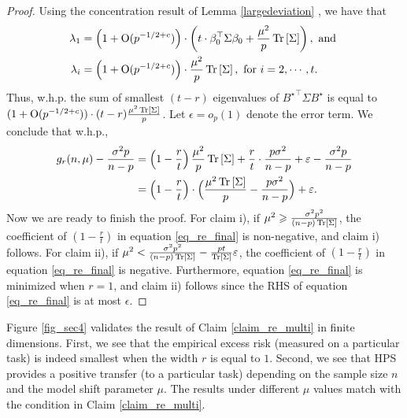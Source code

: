 \begin{proof}
    Using the concentration result of Lemma \ref{largedeviation} , we have that
    \begin{align*}
        \lambda_1 &= \Big(1+\OO(p^{-1/2+c})\Big)\cdot\left(t\cdot \beta_0^\top \Sigma \beta_0  + \frac{\mu^2}{ p}\bigtr{\Sigma}\right) , \text{ and } \\
        \lambda_i &= \Big(1+\OO(p^{-1/2+c})\Big)\cdot \frac{\mu^2}{ p}\bigtr{\Sigma}, \text{ for } i=2,\cdots, t.
    \end{align*}
    Thus, w.h.p. the sum of smallest $(t - r)$ eigenvalues of ${B^{\star}}^{\top}\Sigma  B^{\star}$ is equal to
    $(1+\operatorname{O}(p^{-1/2+c}))\cdot(t-r)\frac{\mu^2 \operatorname{Tr}\left[\Sigma\right]}{p}$.
    Let $\epsilon = o_p(1)$ denote the error term.
    We conclude that w.h.p.,
    \begin{align}
        g_r(n, \mu) - \frac{\sigma^2 p}{n - p} &= \bigbrace{1 - \frac{r}{t}} \frac{\mu^2}{p}\bigtr{\Sigma} + \frac{r}{t} \cdot \frac{p\sigma^2 }{n - p} + \epsilon - \frac{\sigma^2 p}{n - p} \nonumber \\
        &= \Big(1 - \frac r t\Big) \cdot \Big(\frac{\mu^2\bigtr{\Sigma}}{p} - \frac{p\sigma^2}{n - p}\Big) + \epsilon. \label{eq_re_final}
    \end{align}
    Now we are ready to finish the proof.
    For claim i), if $\mu^2 \geqslant \frac{\sigma^2 p^2}{(n - p) \operatorname{Tr}\left[\Sigma\right]}$, the coefficient of $(1 - \frac r t)$ in equation \eqref{eq_re_final} is non-negative, and claim i) follows.
    For claim ii), if $\mu^2 < \frac{\sigma^2 p^2}{(n - p)\operatorname{Tr}\left[\Sigma\right]} - \frac{p t}{\operatorname{Tr}\left[\Sigma\right]}\varepsilon$, the coefficient of $(1 - \frac r t)$ in equation \eqref{eq_re_final} is negative.
    Furthermore, equation \eqref{eq_re_final} is minimized when $r = 1$, and claim ii) follows since the RHS of equation \eqref{eq_re_final} is at most $\epsilon$.
\end{proof}


Figure \ref{fig_sec4} validates the result of Claim \ref{claim_re_multi} in finite dimensions.
First, we see that the empirical excess risk (measured on a particular task) is indeed smallest when the width $r$ is equal to $1$.
Second, we see that HPS provides a positive transfer (to a particular task) depending on the sample size $n$ and the model shift parameter $\mu$.
The results under different $\mu$ values match with the condition in Claim \ref{claim_re_multi}. 














